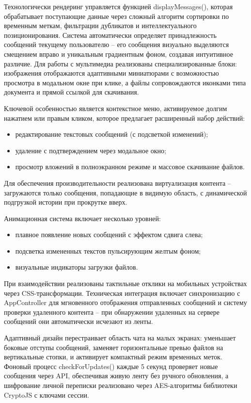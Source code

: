Технологически рендеринг управляется функцией displayMessages(), которая обрабатывает поступающие данные через сложный алгоритм сортировки по временным меткам, фильтрации дубликатов и интеллектуального позиционирования. Система автоматически определяет принадлежность сообщений текущему пользователю – его сообщения визуально выделяются смещением вправо и уникальным градиентным фоном, создавая интуитивное различие. Для работы с мультимедиа реализованы специализированные блоки: изображения отображаются адаптивными миниатюрами с возможностью просмотра в модальном окне при клике, а файлы сопровождаются иконками типа документа и прямой ссылкой для скачивания.

Ключевой особенностью является контекстное меню, активируемое долгим нажатием или правым кликом, которое предлагает расширенный набор действий:
\begin{itemize}
	\item редактирование текстовых сообщений (с подсветкой изменений);
	\item удаление с подтверждением через модальное окно;
	\item просмотр вложений в полноэкранном режиме и массовое скачивание файлов. 
\end{itemize}
	
Для обеспечения производительности реализована виртуализация контента – загружаются только сообщения, попадающие в видимую область, с динамической подгрузкой истории при прокрутке вверх.

Анимационная система включает несколько уровней: 
\begin{itemize}
	\item плавное появление новых сообщений с эффектом сдвига слева;
	\item подсветка измененных текстов пульсирующим желтым фоном;
	\item визуальные индикаторы загрузки файлов. 
\end{itemize}

При взаимодействии реализованы тактильные отклики на мобильных устройствах через CSS-трансформации. Техническая интеграция включает синхронизацию с AppController для мгновенного отображения отправленных сообщений и систему проверки удаленного контента – при обнаружении удаленных на сервере сообщений они автоматически исчезают из ленты.

Адаптивный дизайн перестраивает область чата на малых экранах: уменьшает боковые отступы сообщений, заменяет горизонтальные превью файлов на вертикальные стопки, и активирует компактный режим временных меток. Фоновый процесс checkForUpdates() каждые 5 секунд проверяет новые сообщения через API, обеспечивая живую ленту без ручного обновления, а шифрование личной переписки реализовано через AES-алгоритмы библиотеки CryptoJS с ключами сессии.
